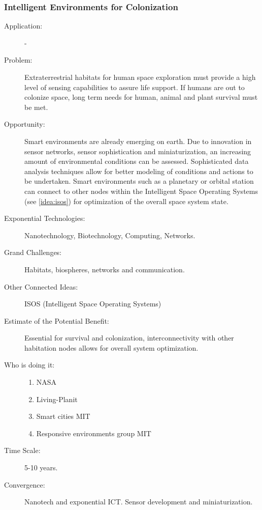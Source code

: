     \subsubsection{Intelligent Environments for Colonization} 
\begin{description}  \item[Application:] -
 
   \item[Problem:] Extraterrestrial habitats for human space exploration  must provide a high level of sensing capabilities to assure life  support. If humans are out to colonize space, long term needs for human,  animal and plant survival must be met.
  
   \item[Opportunity:] Smart environments are already emerging on earth.  Due to innovation in sensor networks, sensor sophistication and  miniaturization, an increasing amount of environmental conditions can be  assessed. Sophisticated data analysis techniques allow for better  modeling of conditions and actions to be undertaken. Smart environments  such as a planetary or orbital station can connect to other nodes within  the Intelligent Space Operating Systems (see \autoref{idea:isos}) for optimization of  the overall space system state.
 
   \item[Exponential Technologies:] Nanotechnology, Biotechnology,  Computing, Networks.
 
   \item[Grand Challenges:] Habitats, biospheres, networks and  communication.
 
   \item[Other Connected Ideas:]  ISOS (Intelligent Space Operating  Systems)
 
   \item[Estimate of the Potential Benefit:] Essential for survival and  colonization, interconnectivity with other habitation nodes allows for  overall system optimization.
 
   \item[Who is doing it:]
  \hfill\begin{enumerate} 
     \item NASA
     \item Living-Planit
     \item Smart cities  MIT
    \item Responsive environments group MIT
     \end{enumerate}
 
   \item[Time Scale:] 5-10 years.
 
   \item[Convergence:] Nanotech and exponential ICT. Sensor development  and miniaturization.
   \end{description}

